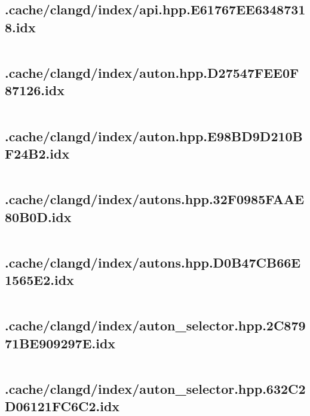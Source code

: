 \subsection{.cache/clangd/index/api.hpp.E61767EE63487318.idx}
\inputminted[linenos,tabsize=2,breaklines, breakanywhere]{c}{api.hpp.E61767EE63487318.idx}
\pagebreak

\subsection{.cache/clangd/index/auton.hpp.D27547FEE0F87126.idx}
\inputminted[linenos,tabsize=2,breaklines, breakanywhere]{c}{auton.hpp.D27547FEE0F87126.idx}
\pagebreak

\subsection{.cache/clangd/index/auton.hpp.E98BD9D210BF24B2.idx}
\inputminted[linenos,tabsize=2,breaklines, breakanywhere]{c}{auton.hpp.E98BD9D210BF24B2.idx}
\pagebreak

\subsection{.cache/clangd/index/autons.hpp.32F0985FAAE80B0D.idx}
\inputminted[linenos,tabsize=2,breaklines, breakanywhere]{c}{autons.hpp.32F0985FAAE80B0D.idx}
\pagebreak

\subsection{.cache/clangd/index/autons.hpp.D0B47CB66E1565E2.idx}
\inputminted[linenos,tabsize=2,breaklines, breakanywhere]{c}{autons.hpp.D0B47CB66E1565E2.idx}
\pagebreak

\subsection{.cache/clangd/index/auton_selector.hpp.2C87971BE909297E.idx}
\inputminted[linenos,tabsize=2,breaklines, breakanywhere]{c}{auton_selector.hpp.2C87971BE909297E.idx}
\pagebreak

\subsection{.cache/clangd/index/auton_selector.hpp.632C2D06121FC6C2.idx}
\inputminted[linenos,tabsize=2,breaklines, breakanywhere]{c}{auton_selector.hpp.632C2D06121FC6C2.idx}
\pagebreak

